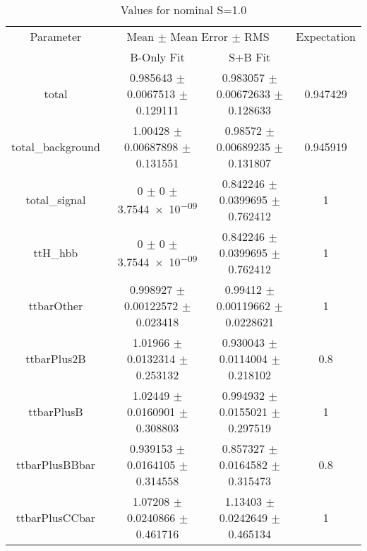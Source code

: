 \begin{table}
\centering
\caption{Values for nominal S=1.0}
\begin{tabular}{cccc}
\toprule
Parameter & \multicolumn{2}{c}{Mean $\pm$ Mean Error $\pm$ RMS} & Expectation\\
 & B-Only Fit & S+B Fit & \\
\midrule
total & \num{0.985643} $\pm$ \num{0.0067513} $\pm$ \num{0.129111} & \num{0.983057} $\pm$ \num{0.00672633} $\pm$ \num{0.128633} & \num{0.947429}\\
total\_background & \num{1.00428} $\pm$ \num{0.00687898} $\pm$ \num{0.131551} & \num{0.98572} $\pm$ \num{0.00689235} $\pm$ \num{0.131807} & \num{0.945919}\\
total\_signal & \num{0} $\pm$ \num{0} $\pm$ \num{3.7544e-09} & \num{0.842246} $\pm$ \num{0.0399695} $\pm$ \num{0.762412} & \num{1}\\
ttH\_hbb & \num{0} $\pm$ \num{0} $\pm$ \num{3.7544e-09} & \num{0.842246} $\pm$ \num{0.0399695} $\pm$ \num{0.762412} & \num{1}\\
ttbarOther & \num{0.998927} $\pm$ \num{0.00122572} $\pm$ \num{0.023418} & \num{0.99412} $\pm$ \num{0.00119662} $\pm$ \num{0.0228621} & \num{1}\\
ttbarPlus2B & \num{1.01966} $\pm$ \num{0.0132314} $\pm$ \num{0.253132} & \num{0.930043} $\pm$ \num{0.0114004} $\pm$ \num{0.218102} & \num{0.8}\\
ttbarPlusB & \num{1.02449} $\pm$ \num{0.0160901} $\pm$ \num{0.308803} & \num{0.994932} $\pm$ \num{0.0155021} $\pm$ \num{0.297519} & \num{1}\\
ttbarPlusBBbar & \num{0.939153} $\pm$ \num{0.0164105} $\pm$ \num{0.314558} & \num{0.857327} $\pm$ \num{0.0164582} $\pm$ \num{0.315473} & \num{0.8}\\
ttbarPlusCCbar & \num{1.07208} $\pm$ \num{0.0240866} $\pm$ \num{0.461716} & \num{1.13403} $\pm$ \num{0.0242649} $\pm$ \num{0.465134} & \num{1}\\
\bottomrule
\end{tabular}
\end{table}